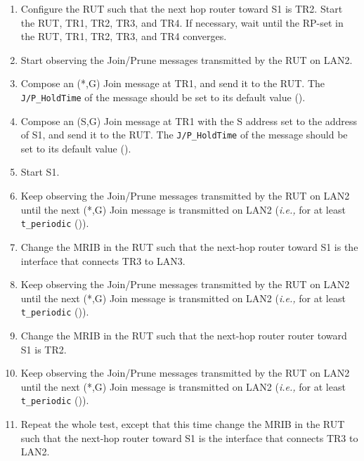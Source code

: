 \documentclass[11pt]{report}
\newcommand{\ie}{\emph{i.e.,}\xspace}
\begin{document}
\begin{enumerate}

  \item Configure the RUT such that the next hop router toward S1 is
  TR2. Start the RUT, TR1, TR2, TR3, and TR4. If necessary, wait until the
  RP-set in the RUT, TR1, TR2, TR3, and TR4 converges.

  \item Start observing the Join/Prune messages transmitted by the RUT on
  LAN2.

  \item Compose an (*,G) Join message at TR1, and send it to the RUT. 
  The \verb=J/P_HoldTime= of the message should be set to its default
  value ({\PimsmJPHoldTime}).

  \item Compose an (S,G) Join message at TR1 with the S address set to the
  address of S1, and send it to the RUT. 
  The \verb=J/P_HoldTime= of the message should be set to its default
  value ({\PimsmJPHoldTime}).

  \item Start S1.

  \item Keep observing the Join/Prune messages transmitted by the
  RUT on LAN2 until the next (*,G) Join message is transmitted on
  LAN2 (\ie for at least \verb=t_periodic= ({\PimsmTPeriodic})).

  \item Change the MRIB in the RUT such that the next-hop
  router toward S1 is the interface that connects TR3 to LAN3.

  \item Keep observing the Join/Prune messages transmitted by the
  RUT on LAN2 until the next (*,G) Join message is transmitted on
  LAN2 (\ie for at least \verb=t_periodic= ({\PimsmTPeriodic})).

  \item Change the MRIB in the RUT such that the next-hop router
  router toward S1 is TR2.

  \item Keep observing the Join/Prune messages transmitted by the
  RUT on LAN2 until the next (*,G) Join message is transmitted on
  LAN2 (\ie for at least \verb=t_periodic= ({\PimsmTPeriodic})).

  \item Repeat the whole test, except that this time change the MRIB in the
  RUT such that the next-hop router toward S1 is the interface that connects
  TR3 to LAN2.

\end{enumerate}
\end{document}
